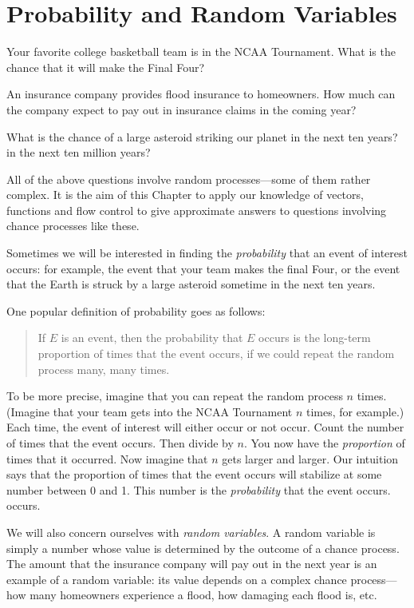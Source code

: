 \documentclass[]{book}
\theoremstyle{definition}
\theoremstyle{definition}
\theoremstyle{definition}
\theoremstyle{remark}
\begin{document}
{\newpage

\section{Probability and Random
Variables}\label{probability-and-random-variables}

Your favorite college basketball team is in the NCAA Tournament. What is
the chance that it will make the Final Four?

An insurance company provides flood insurance to homeowners. How much
can the company expect to pay out in insurance claims in the coming
year?

What is the chance of a large asteroid striking our planet in the next
ten years? in the next ten million years?

All of the above questions involve random processes---some of them
rather complex. It is the aim of this Chapter to apply our knowledge of
vectors, functions and flow control to give approximate answers to
questions involving chance processes like these.

Sometimes we will be interested in finding the \emph{probability} that
an event of interest occurs: for example, the event that your team makes
the final Four, or the event that the Earth is struck by a large
asteroid sometime in the next ten years.

One popular definition of probability goes as
follows:

\begin{quote}
If \(E\) is an event, then the probability that \(E\) occurs is the
long-term proportion of times that the event occurs, if we could repeat
the random process many, many times.
\end{quote}

To be more precise, imagine that you can repeat the random process \(n\)
times. (Imagine that your team gets into the NCAA Tournament \(n\)
times, for example.) Each time, the event of interest will either occur
or not occur. Count the number of times that the event occurs. Then
divide by \(n\). You now have the \emph{proportion} of times that it
occurred. Now imagine that \(n\) gets larger and larger. Our intuition
says that the proportion of times that the event occurs will stabilize
at some number between 0 and 1. This number is the \emph{probability}
that the event occurs. occurs.

We will also concern ourselves with \emph{random variables}.
A random variable is simply a number whose value
is determined by the outcome of a chance process. The amount that the
insurance company will pay out in the next year is an example of a
random variable: its value depends on a complex chance process---how
many homeowners experience a flood, how damaging each flood is, etc.

}
\end{document}
